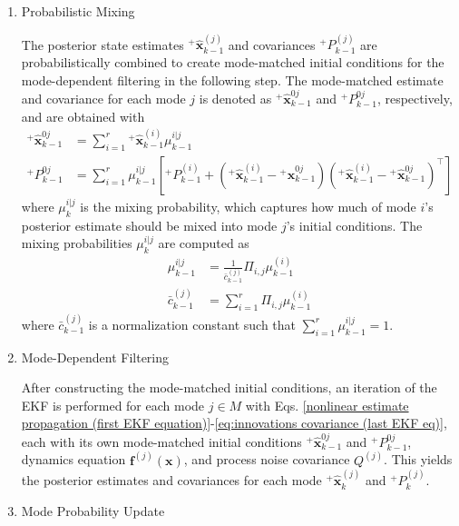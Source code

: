 \documentclass[letterpaper, preprint, paper,11pt]{AAS}	%
\begin{document}
\begin{enumerate}
    \item Probabilistic Mixing

    The posterior state estimates ${}^+\hat{\bm{x}}_{k-1}^{(j)}$ and covariances ${}^+P_{k-1}^{(j)}$ are probabilistically combined to create mode-matched initial conditions for the mode-dependent filtering in the following step. The mode-matched estimate and covariance for each mode $j$ is denoted as ${}^{+}\hat{\bm{x}}_{k-1}^{0j}$ and ${}^+P_{k-1}^{0j}$, respectively, and are obtained with
    \begin{align}
        {}^+\hat{\bm{x}}_{k-1}^{0j} &= \sum_{i=1}^r {}^+\hat{\bm{x}}_{k-1}^{(i)} \mu_{k-1}^{i|j} \label{eq:mixed-initial-mean}\\
        {}^+P_{k-1}^{0j} &= \sum_{i=1}^r  \mu_{k-1}^{i|j} [{}^+P_{k-1}^{(i)} + ({}^+\bm{\hat{x}}_{k-1}^{(i)} - {}^+\bm{\hat{x}}_{k-1}^{0j})({}^+\bm{\hat{x}}_{k-1}^{(i)} - {}^+\bm{\hat{x}}_{k-1}^{0j})^\top ] \label{eq:mixed-initial-covariance}
    \end{align}
    \noindent where $\mu_k^{i|j}$ is the mixing probability, which captures how much of mode $i$'s posterior estimate should be mixed into mode $j$'s initial conditions. The mixing probabilities $\mu_k^{i|j}$ are computed as
    \begin{align}
        \mu_{k-1}^{i|j} &= \frac{1}{\bar{c}_{k-1}^{(j)}} \Pi_{i,j} \mu_{k-1}^{(i)} \\
        \bar{c}_{k-1}^{(j)} &= \sum_{i=1}^r \Pi_{i,j} \mu_{k-1}^{(i)} \label{mixing probability constant}
    \end{align}
    \noindent where $\bar{c}_{k-1}^{(j)}$ is a normalization constant such that $\sum_{i=1}^r \mu_{k-1}^{i|j} = 1$.
    
    \item Mode-Dependent Filtering

    After constructing the mode-matched initial conditions, an iteration of the EKF is performed for each mode $j \in M$ with Eqs. \ref{nonlinear estimate propagation (first EKF equation)}-\ref{eq:innovations covariance (last EKF eq)}, each with its own mode-matched initial conditions ${}^+\bm{\hat{x}}_{k-1}^{0j}$ and ${}^+P_{k-1}^{0j}$, dynamics equation $\bm{f}^{(j)}(\bm{x})$, and process noise covariance $Q^{(j)}$. This yields the posterior estimates and covariances for each mode ${}^+\hat{\bm{x}}_k^{(j)}$ and ${}^+P_k^{(j)}$.

    \item Mode Probability Update


\end{enumerate}
\end{document}
